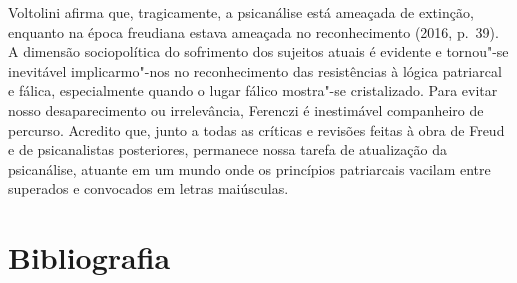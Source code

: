 Voltolini afirma que, tragicamente, a psicanálise está ameaçada de
extinção, enquanto na época freudiana estava ameaçada no reconhecimento
(2016, p.~39). A dimensão sociopolítica do sofrimento dos sujeitos atuais
é evidente e tornou"-se inevitável implicarmo"-nos no reconhecimento das
resistências à lógica patriarcal e fálica, especialmente quando o lugar
fálico mostra"-se cristalizado. Para evitar nosso desaparecimento ou
irrelevância, Ferenczi é inestimável companheiro de percurso. Acredito
que, junto a todas as críticas e revisões feitas à obra de Freud e de
psicanalistas posteriores, permanece nossa tarefa de atualização da
psicanálise, atuante em um mundo onde os princípios patriarcais vacilam
entre superados e convocados em letras maiúsculas.

\pagebreak

\section{Bibliografia}

